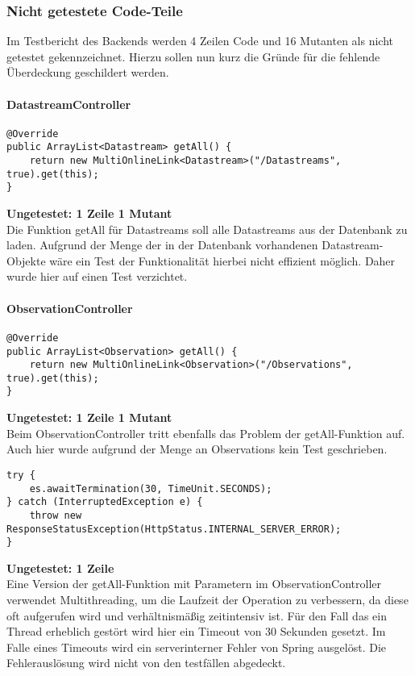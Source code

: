 \subsubsection{Nicht getestete Code-Teile}
Im Testbericht des Backends werden 4 Zeilen Code und 16 Mutanten als nicht getestet gekennzeichnet.
Hierzu sollen nun kurz die Gründe für die fehlende Überdeckung geschildert werden.

\paragraph{DatastreamController}
\begin{lstlisting}[style=customjava]
@Override
public ArrayList<Datastream> getAll() {
    return new MultiOnlineLink<Datastream>("/Datastreams", true).get(this);
}
\end{lstlisting}
\textbf{Ungetestet: 1 Zeile 1 Mutant}
\\
Die Funktion getAll für Datastreams soll alle Datastreams aus der Datenbank zu laden.
Aufgrund der Menge der in der Datenbank vorhandenen Datastream-Objekte wäre ein Test der Funktionalität hierbei nicht effizient möglich.
Daher wurde hier auf einen Test verzichtet.

\paragraph{ObservationController}
\begin{lstlisting}[style=customjava]
@Override
public ArrayList<Observation> getAll() {
    return new MultiOnlineLink<Observation>("/Observations", true).get(this);
}
\end{lstlisting}
\textbf{Ungetestet: 1 Zeile 1 Mutant}
\\
Beim ObservationController tritt ebenfalls das Problem der getAll-Funktion auf.
Auch hier wurde aufgrund der Menge an Observations kein Test geschrieben.

\begin{lstlisting}[style=customjava]
try {
    es.awaitTermination(30, TimeUnit.SECONDS);
} catch (InterruptedException e) {
    throw new ResponseStatusException(HttpStatus.INTERNAL_SERVER_ERROR);
}
\end{lstlisting}
\textbf{Ungetestet: 1 Zeile}
\\
Eine Version der getAll-Funktion mit Parametern im ObservationController verwendet Multithreading, um die Laufzeit der Operation zu verbessern, da diese oft aufgerufen wird und verhältnismäßig zeitintensiv ist.
Für den Fall das ein Thread erheblich gestört wird hier ein Timeout von 30 Sekunden gesetzt. Im Falle eines Timeouts wird ein serverinterner Fehler von Spring ausgelöst.
Die Fehlerauslösung wird nicht von den testfällen abgedeckt.

